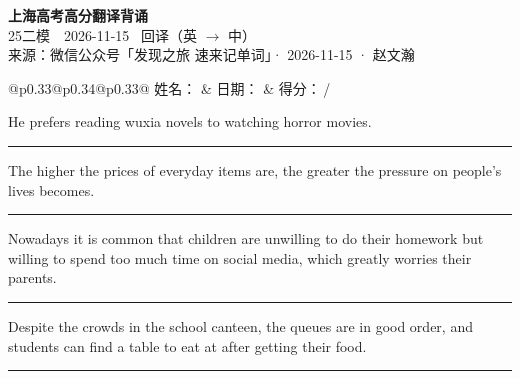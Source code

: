 \documentclass[11pt,a4paper]{article}
\newcommand{\num}[1]{\makebox[1.9em][r]{#1.}\hspace{0.3em}}
\newcommand{\wline}{\noindent\rule{\linewidth}{0.4pt}}
\begin{document}
\pagestyle{plain}
\begin{center}
{\LARGE\bfseries 上海高考高分翻译背诵 }\\[0.25em]
{\large 25二模　2026-11-15 \quad\ 回译（英 $\to$ 中）}\\[0.35em]
{\footnotesize 来源：微信公众号「发现之旅 速来记单词」· 2026-11-15 · 赵文瀚}
\end{center}

\vspace{0.4em}
\noindent\begin{tabular}{@{}p{0.33\textwidth}@{}p{0.34\textwidth}@{}p{0.33\textwidth}@{}}
姓名：\underline{\hspace{2.0cm}} & 日期：\underline{\hspace{2.0cm}} & 得分：\underline{\hspace{1.4cm}}\,/ \\
\end{tabular}

\vspace{0.5em}

\vspace{0.8em}
\num{1}He prefers reading wuxia novels to watching horror movies.

\vspace{0.25em}

\wline

\num{2}The higher the prices of everyday items are, the greater the pressure on people’s lives becomes.

\vspace{0.25em}

\wline

\num{3}Nowadays it is common that children are unwilling to do their homework but willing to spend too much time on social media, which greatly worries their parents.

\vspace{0.25em}

\wline

\num{4}Despite the crowds in the school canteen, the queues are in good order, and students can find a table to eat at after getting their food.

\vspace{0.25em}

\wline
\end{document}
